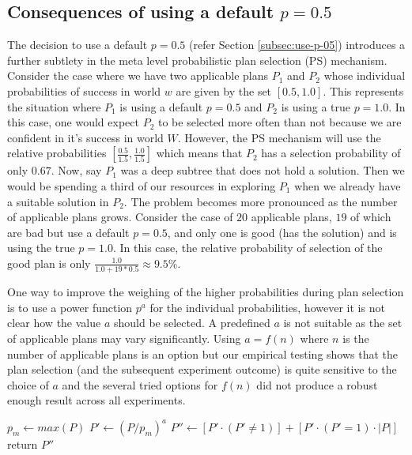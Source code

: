 \documentclass[a4paper]{article}
\begin{document}
\subsection{Consequences of using a default $p=0.5$}
\label{subsec:consequence-p}

The decision to use a default $p=0.5$ (refer Section \ref{subsec:use-p-05}) introduces a further subtlety in the meta level probabilistic plan selection (PS) mechanism. Consider the case where we have two applicable plans $P_1$ and $P_2$ whose individual probabilities of success in world $w$ are given by the set $[0.5 , 1.0]$. This represents the situation where $P_1$ is using a default $p=0.5$ and $P_2$ is using a true $p=1.0$. In this case, one would expect $P_2$ to be selected more often than not because we are confident in it's success in world $W$. However, the PS mechanism will use the relative probabilities $[\frac{0.5}{1.5} , \frac{1.0}{1.5}]$ which means that $P_2$ has a selection probability of only $0.67$. Now, say $P_1$ was a deep subtree that does not hold a solution. Then we would be spending a third of our resources in exploring $P_1$ when we already have a suitable solution in $P_2$. The problem becomes more pronounced as the number of applicable plans grows. Consider the case of $20$ applicable plans, $19$ of which are bad but use a default $p=0.5$, and only one is good (has the solution) and is using the true $p=1.0$. In this case, the relative probability of selection of the good plan is only $\frac{1.0}{1.0 + 19*0.5} \approx 9.5\%$.

One way to improve the weighing of the higher probabilities during plan selection is to use a power function $p^a$ for the individual probabilities, however it is not clear how the value $a$ should be selected. A predefined $a$ is not suitable as the set of applicable plans may vary significantly. Using $a=f(n)$ where $n$ is the number of applicable plans is an option but our empirical testing shows that the plan selection (and the subsequent experiment outcome) is quite sensitive to the choice of $a$ and the several tried options for $f(n)$ did not produce a robust enough result across all experiments.

\begin{algorithm}[htb]
\caption{$pSelect(P)$}
\label{alg:pselect}
\begin{algorithmic}[1]
\STATE $p_m \leftarrow max(P)$
\STATE $P' \leftarrow (P/p_m)^a$
\STATE $P'' \leftarrow [P' \cdot (P' \neq 1)] + [P' \cdot (P' = 1) \cdot |P|]$
\STATE return $P''$
\end{algorithmic}
\end{algorithm}
\end{document}
